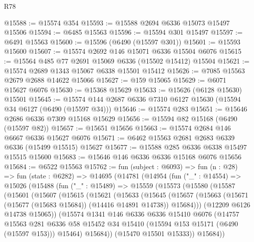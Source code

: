 \begin{lexlean}{R78}
\begin{coremodule}
@15588 := @15574 @354
@15593 := @15588 @2694 @6336 @15073 @15497 @15506
@15594 := @6485 @15563
@15596 := @15594 @301 @15497
@15597 := @6491 @15563
@15600 := @15596 (@6490 (@15597 @301))
@15601 := @15593 @15600
@15607 := @15574 @2692 @146 @15071 @6336 @15504 @6076
@15615 := @15564 @485 @77 @2691 @15069 @6336 (@15502 @15412) @15504
@15621 := @15574 @2689 @1343 @15067 @6338 @15501 @15412
@15626 := @7085 @15563 @2679 @2688 @14622 @15066
@15627 := @159 @15065
@15629 := @6071 @15627 @6076
@15630 := @15368 @15629
@15633 := @15626 (@6128 @15630) @15501
@15645 := @15574 @144 @2687 @6336 @7310 @6127 @15630 (@15594 @34 @6127 (@6490 (@15597 @34)))
@15646 := @15574 @283
@15651 := @15646 @2686 @6336 @7309 @15168 @15629
@15656 := @15594 @82 @15168 (@6490 (@15597 @82))
@15657 := @15651 @15656
@15663 := @15574 @2684 @146 @6667 @6336 @15627 @6076
@15671 := @6462 @15563 @2681 @2683 @6339 @6336 (@15499 @15515) @15627
@15677 := @15588 @285 @6336 @6338 @15497 @15515 @15600
@15683 := @15646 @146 @6336 @6336 @15168 @6076 @15656
@15684 := @6522 @15563
@15762 := fun (subject : @6093) =>
  fun (n : @28) =>
  fun (state : @6282) =>
  @14695
    (@14781
      (@14954
        (fun ("_" : @14554) =>
        @15026
          (@15488
            (fun ("_" : @15489) =>
            @15559
              (@15573
                (@15580
                  (@15587
                    (@15601
                      (@15607
                        (@15615
                          (@15621
                            (@15633
                              (@15645
                                (@15657
                                  (@15663
                                    (@15671 (@15677 (@15683 @15684)) (@14416 @14891 @14738))
                                    @15684)))
                              (@12209 @6126 @14738 @15065))
                            (@15574
                              @1341
                              @146
                              @6336
                              @6336
                              @15410
                              @6076
                              (@14757
                                @15563
                                @281
                                @6336
                                @58
                                @15452
                                @34
                                @15410
                                (@15594 @153 @15171 (@6490 (@15597 @153)))
                                @15464)
                              @15684))
                          (@15470 @15501 @15333))
                        @15684))

\end{coremodule}
\end{lexlean}
